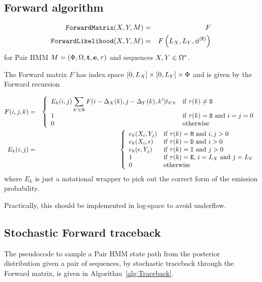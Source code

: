 \documentclass{article}
\newcommand\algoref[1]{Algorithm~\ref{alg:#1}}
\begin{document}
\subsection{Forward algorithm}

\begin{eqnarray*}
{\tt ForwardMatrix}(X,Y,M) & = & F \\
{\tt ForwardLikelihood}(X,Y,M) & = & F\left(L_X,L_Y, \phi^{({\tt E})}\right)
\end{eqnarray*}
for Pair HMM $M = (\Phi,\Omega,{\bf t},{\bf e},\tau)$ and
sequences $X,Y \in \Omega^\ast$.

The Forward matrix $F$ has index space $[0,L_X] \times [0,L_Y] \times \Phi$
and is given by the Forward recursion

\begin{eqnarray*}
    F(i,j,k) & = & \left\{ \begin{array}{ll}
\displaystyle
E_k(i,j)
\sum_{k' \in \Phi}
F(i-\Delta_{X}(k),j-\Delta_{Y}(k),k') t_{k'k}
& \mbox{if $\tau(k) \neq {\tt S}$} \\
1 & \mbox{if $\tau(k) = {\tt S}$ and $i=j=0$} \\
0 & \mbox{otherwise}
    \end{array} \right. \\
E_k(i,j) & = & \left\{
\begin{array}{ll}
\displaystyle
e_k(X_i,Y_j) &  \mbox{if $\tau(k) = {\tt M}$ and $i,j > 0$} \\
\displaystyle
e_k(X_i,\epsilon) &  \mbox{if $\tau(k) = {\tt D}$ and $i > 0$} \\
\displaystyle
e_k(\epsilon,Y_j) &  \mbox{if $\tau(k) = {\tt I}$ and $j > 0$} \\
1 & \mbox{if $\tau(k) = {\tt E}$, $i=L_X$ and $j=L_Y$} \\
0 & \mbox{otherwise}
\end{array}
\right.
\end{eqnarray*}
where $E_k$ is just a notational wrapper to pick out the correct form of the emission probability.

Practically, this should be implemented in log-space to avoid underflow.

\subsection{Stochastic Forward traceback}

The pseudocode to sample a Pair HMM state path from the posterior distribution given
a pair of sequences, by stochastic traceback through the Forward matrix,
is given in \algoref{Traceback}.
\end{document}
